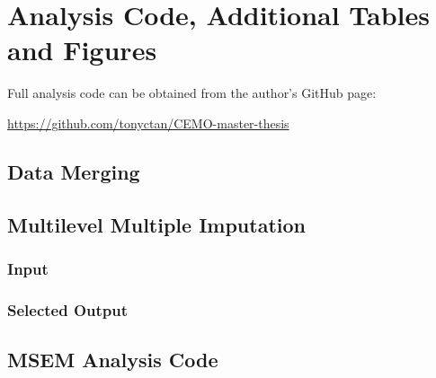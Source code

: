 \chapter{Analysis Code, Additional Tables and Figures}

Full analysis code can be obtained from the author's GitHub page:

\href{https://github.com/tonyctan/CEMO-master-thesis}{https://github.com/tonyctan/CEMO-master-thesis}

\section{Data Merging}\label{R.reimport}

\begin{singlespacing}
    
\end{singlespacing}





\section{Multilevel Multiple Imputation}

\subsection{\cM Input}\label{sec:MMI}

\begin{singlespacing}
    
\end{singlespacing}

\subsection{Selected \cM Output}

\begin{singlespacing}
    
\end{singlespacing}





\section{MSEM Analysis Code}

